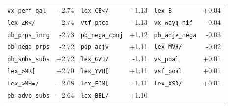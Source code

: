 \begin{longtable}{lrlrlr}
\texttt{vx\_perf\_qal} & +2.74 & \texttt{lex\_CB\textless{}/} & -1.13 & \texttt{lex\_B} & +0.04 \\
\texttt{lex\_ZR\textless{}/} & -2.74 & \texttt{vtf\_ptca} & -1.13 & \texttt{vx\_wayq\_nif} & -0.04 \\
\texttt{pb\_prps\_inrg} & -2.73 & \texttt{pb\_nega\_conj} & +1.12 & \texttt{pb\_adjv\_nega} & -0.03 \\
\texttt{pb\_nega\_prps} & -2.72 & \texttt{pdp\_adjv} & +1.11 & \texttt{lex\_MVH/} & -0.02 \\
\texttt{pb\_subs\_subs} & +2.72 & \texttt{lex\_GWJ/} & -1.11 & \texttt{vs\_poal} & +0.01 \\
\texttt{lex\_\textgreater{}MR[} & +2.70 & \texttt{lex\_YWH[} & +1.11 & \texttt{vsf\_poal} & +0.01 \\
\texttt{lex\_\textgreater{}MH=/} & +2.68 & \texttt{lex\_FJM[} & -1.11 & \texttt{lex\_XSD/} & +0.01 \\
\texttt{pb\_advb\_subs} & +2.64 & \texttt{lex\_BBL/} & +1.10 &  &  \\
\end{longtable}
\endgroup
